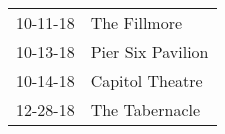 \begin{supertabular}{p{0.25\columnwidth}p{0.75\columnwidth}}
 10-11-18 &       The Fillmore \\
 10-13-18 &  Pier Six Pavilion \\
 10-14-18 &    Capitol Theatre \\
 12-28-18 &     The Tabernacle \\
\end{supertabular}
